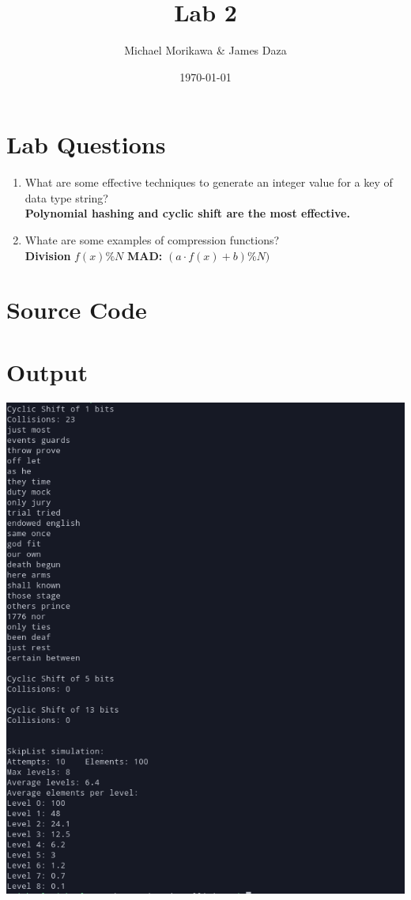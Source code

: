 \documentclass{article}
\title{Lab 2}
\author{Michael Morikawa \& James Daza}
\date{\today}
\begin{document}
    \maketitle
    \section{Lab Questions}
    \begin{enumerate}[label=\textbf{Question \arabic*}]
        \item What are some effective techniques to generate an integer value 
        for a key of data type string?\\
        \textbf{
            Polynomial hashing and cyclic shift are the most effective.
        }
        \item Whate are some examples of compression functions? \\
        \textbf{Division} $f(x)\%N$ \textbf{MAD: }$(a \cdot f(x) + b)\%N)$
    \end{enumerate}

    \section{Source Code}
    


    \section{Output}
    \includegraphics[scale=0.7]{lab2_output.png}
\end{document}
